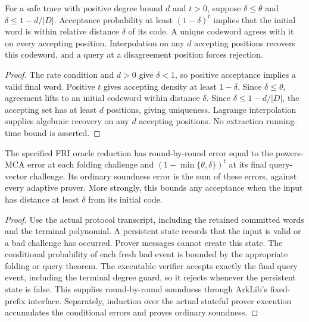 \begin{theorem}\label{thm:fri-binding}
\leanok
{}
For a safe trace with positive degree bound $d$ and $t>0$, suppose
$\delta\leq\theta$ and $\delta\leq 1-d/|D|$.
Acceptance probability at least $(1-\delta)^t$ implies that the initial word is
within relative distance $\delta$ of its code. A unique codeword agrees with it
on every accepting position. Interpolation on any $d$ accepting positions
recovers this codeword, and a query at a disagreement position forces rejection.
\end{theorem}
\begin{proof}
\leanok
The rate condition and $d>0$ give $\delta<1$, so positive acceptance implies a
valid final word. Positive $t$ gives accepting density at least $1-\delta$.
Since $\delta\leq\theta$, agreement lifts to an initial codeword within distance
$\delta$. Since $\delta\leq 1-d/|D|$, the accepting set has at least $d$ positions,
giving uniqueness. Lagrange interpolation supplies algebraic recovery on any
$d$ accepting positions. No extraction running-time bound is asserted.
\end{proof}

\begin{theorem}\label{thm:fri-soundness}
\leanok
{}
The specified FRI oracle reduction has round-by-round error equal to the
powers-MCA error at each folding challenge and $(1-\min\{\theta,\delta\})^t$
at its final query-vector challenge. Its ordinary soundness error is the sum of
these errors, against every adaptive prover. More strongly, this bounds any
acceptance when the input has distance at least $\delta$ from its initial code.
\end{theorem}
\begin{proof}
\leanok
Use the actual protocol transcript, including the retained committed words and
the terminal polynomial. A persistent state records that the input is valid or
a bad challenge has occurred. Prover messages cannot create this state.
The conditional probability of each fresh bad event is bounded by the appropriate
folding or query theorem. The executable verifier accepts exactly the final
query event, including the terminal degree guard, so it rejects whenever the
persistent state is false. This supplies round-by-round soundness through ArkLib's
fixed-prefix interface. Separately, induction over the actual stateful prover
execution accumulates the conditional errors and proves ordinary soundness.
\end{proof}

